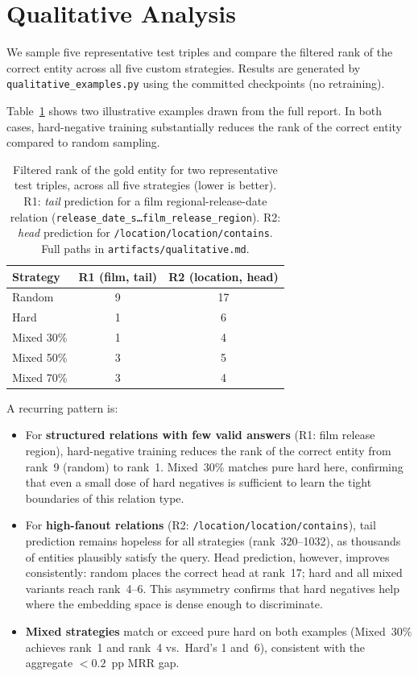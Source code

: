 \documentclass[10pt,twocolumn,letterpaper]{article}
\begin{document}
\section{Qualitative Analysis}
\label{sec:qualitative}

We sample five representative test triples and compare the filtered rank of the
correct entity across all five custom strategies. Results are generated by
\texttt{qualitative\_examples.py} using the committed checkpoints (no retraining).

Table~\ref{tab:qualitative} shows two illustrative examples drawn from the
full report. In both cases, hard-negative training substantially reduces the
rank of the correct entity compared to random sampling.

\begin{table}[ht]
\centering\scriptsize
\caption{Filtered rank of the gold entity for two representative test
triples, across all five strategies (lower is better).
R1: \emph{tail} prediction for a film regional-release-date relation
(\texttt{release\_date\_s\ldots film\_release\_region}).
R2: \emph{head} prediction for \texttt{/location/location/contains}.
Full paths in \texttt{artifacts/qualitative.md}.}
\label{tab:qualitative}
\begin{tabular}{@{}lcc@{}}
\toprule
Strategy   & R1 (film, tail) & R2 (location, head) \\
\midrule
Random     &  9 & 17 \\
Hard       &  1 &  6 \\
Mixed 30\% &  1 &  4 \\
Mixed 50\% &  3 &  5 \\
Mixed 70\% &  3 &  4 \\
\bottomrule
\end{tabular}
\end{table}

\noindent A recurring pattern is:
\begin{itemize}
  \item For \textbf{structured relations with few valid answers}
    (R1: film release region),
    hard-negative training reduces the rank of the correct entity
    from rank~9 (random) to rank~1.
    Mixed~30\% matches pure hard here, confirming that even a small dose
    of hard negatives is sufficient to learn the tight boundaries of
    this relation type.
  \item For \textbf{high-fanout relations}
    (R2: \texttt{/location/location/contains}),
    tail prediction remains hopeless for all strategies
    (rank~320--1032), as thousands of entities plausibly satisfy the
    query. Head prediction, however, improves consistently: random
    places the correct head at rank~17; hard and all mixed variants
    reach rank~4--6. This asymmetry confirms that hard negatives help
    where the embedding space is dense enough to discriminate.
  \item \textbf{Mixed strategies} match or exceed pure hard on both
    examples (Mixed~30\% achieves rank~1 and rank~4 vs.\ Hard's 1
    and~6), consistent with the aggregate $<\!0.2$~pp MRR gap.
\end{itemize}
\end{document}

